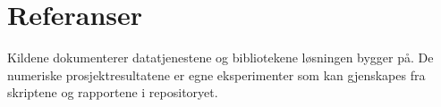 \section{Referanser}

Kildene dokumenterer datatjenestene og bibliotekene løsningen bygger på. De
numeriske prosjektresultatene er egne eksperimenter som kan gjenskapes fra skriptene
og rapportene i repositoryet.

\printbibliography[heading=none]
